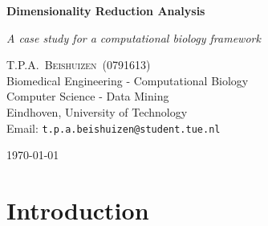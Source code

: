 \documentclass[10pt,a4paper]{article}
\newcommand{\documenttitle}{Dimensionality Reduction Analysis}
\newcommand{\documentsubtitle}{A case study for a computational biology framework}
\begin{document}
	
	\begin{titlepage}
		
		\center
		
		\vspace*{3cm}
		
		\textbf{\huge \documenttitle}
		
		\textit{\LARGE \documentsubtitle}
		
		\vspace*{2cm}
		
		\large
		\centering
		T.P.A.~\textsc{Beishuizen}~(0791613)\\
		Biomedical Engineering - Computational Biology\\
		Computer Science - Data Mining\\
		Eindhoven, University of Technology\\
		Email: \texttt{t.p.a.beishuizen@student.tue.nl}
		
		\vfill
		
		\vspace*{1cm}
		
		\today
		
	\end{titlepage}
	
	\tableofcontents
	
	
	\pagestyle{fancy}
	\fancyhead{} %
	\fancyfoot{} %
	\renewcommand{\headrulewidth}{0.4pt}
	\renewcommand{\footrulewidth}{0.4pt}
	
	\fancyhead[L]{\rightmark}
	\fancyfoot[C]{\thepage}
	
	
	\clearpage
	
	\section{Introduction}
	\label{sec:Introduction}
	
\end{document}
